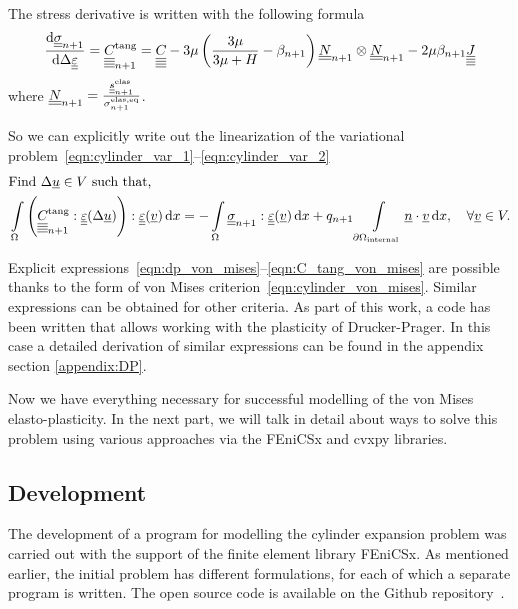 \documentclass[12pt]{article}
\begin{document}
The stress derivative is written with the following formula
\begin{equation}
    \dfrac{\mathrm{d}\underline{\underline{\sigma}}_{n+1}}{\mathrm{d}\Delta\underline{\underline{\varepsilon}}} = \underline{\underline{\underline{\underline{C_{}}}}}_{n+1}^{\text{tang}} = \underline{\underline{\underline{\underline{C_{}}}}} - 3\mu \left( \frac{3\mu}{3\mu + H} -\beta_{n+1} \right) \underline{\underline{N}}_{n+1} \otimes \underline{\underline{N}}_{n+1} - 2\mu\beta_{n+1}\underline{\underline{\underline{\underline{J}}}} \label{eqn:C_tang_von_mises}
\end{equation}
where $\underline{\underline{N}}_{n+1} = \frac{\underline{\underline{s}}^\text{elas}_{n+1}}{\sigma_{n+1}^\text{elas,eq}}$.

So we can explicitly write out the linearization of the variational problem~\eqref{eqn:cylinder_var_1}--\eqref{eqn:cylinder_var_2}
\begin{align}
    & \text{Find } \Delta\underline{u} \in V \text{ such that,} \label{eqn:cylinder_lin_var_from_1} \\ 
    & \int\limits_\Omega \left( \underline{\underline{\underline{\underline{C_{}}}}}_{n+1}^\text{tang} : \underline{\underline{\varepsilon}}(\Delta\underline{u}) \right) : \underline{\underline{\varepsilon}}(\underline{v}) \, \mathrm{d} x = -\int\limits_\Omega\underline{\underline{\sigma}}_{n+1} : \underline{\underline{\varepsilon}}(\underline{v}) \, \mathrm{d} x + q_{n+1}\int\limits_{\partial\Omega_\text{internal}}\underline{n} \cdot \underline{v} \, \mathrm{d} x, \quad \forall \underline{v} \in V. \label{eqn:cylinder_lin_var_from_2} 
\end{align}

Explicit expressions~\eqref{eqn:dp_von_mises}--\eqref{eqn:C_tang_von_mises} are possible thanks to the form of von Mises criterion~\eqref{eqn:cylinder_von_mises}. Similar expressions can be obtained for other criteria. As part of this work, a code has been written that allows working with the plasticity of Drucker-Prager. In this case a detailed derivation of similar expressions can be found in the appendix section \ref{appendix:DP}.

Now we have everything necessary for successful modelling of the von Mises elasto-plasticity. In the next part, we will talk in detail about ways to solve this problem using various approaches via the FEniCSx and cvxpy libraries.

\subsection{Development}
\label{sec:development}

The development of a program for modelling the cylinder expansion problem was carried out with the support of the finite element library FEniCSx. As mentioned earlier, the initial problem has different formulations, for each of which a separate program is written. The open source code is available on the Github repository~\cite{convex-plasticity}. 
\end{document}
